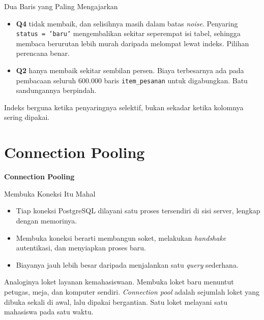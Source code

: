 \documentclass[aspectratio=169, table, 12pt]{beamer}
\begin{document}
\begin{frame}{{\Large Dua Baris yang Paling Mengajarkan}}
  \vspace{8pt}
  \begin{itemize}
    \item \textbf{Q4} tidak membaik, dan selisihnya masih dalam batas \textit{noise}.
          Penyaring \texttt{status = 'baru'} mengembalikan sekitar seperempat
          isi tabel, sehingga membaca berurutan lebih murah daripada melompat
          lewat indeks. Pilihan perencana benar.
    \item \textbf{Q2} hanya membaik sekitar sembilan persen. Biaya terbesarnya
          ada pada pembacaan seluruh 600.000 baris \texttt{item\_pesanan}
          untuk digabungkan. Batu sandungannya berpindah.
  \end{itemize}
  \vspace{6pt}
  {\footnotesize Indeks berguna ketika penyaringnya selektif, bukan sekadar
  ketika kolomnya sering dipakai.}
\end{frame}

\section{Connection Pooling}

\begin{frame}{\hfill}
  \centering
  \Huge{\textbf{Connection Pooling}}
\end{frame}

\begin{frame}{{\Large Membuka Koneksi Itu Mahal}}
  \vspace{10pt}
  \begin{itemize}
    \item Tiap koneksi PostgreSQL dilayani satu proses tersendiri di sisi
          server, lengkap dengan memorinya.
    \item Membuka koneksi berarti membangun soket, melakukan
          \textit{handshake} autentikasi, dan menyiapkan proses baru.
    \item Biayanya jauh lebih besar daripada menjalankan satu \textit{query}
          sederhana.
  \end{itemize}
  \vspace{10pt}
  {\footnotesize Analoginya loket layanan kemahasiswaan. Membuka loket baru
  menuntut petugas, meja, dan komputer sendiri. \textit{Connection pool} adalah
  sejumlah loket yang dibuka sekali di awal, lalu dipakai bergantian. Satu
  loket melayani satu mahasiswa pada satu waktu.}
\end{frame}
\end{document}
